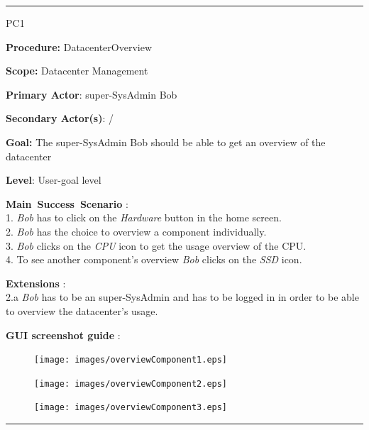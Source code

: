 \hrule
\vspace{0.5cm}
\begin{lyxlist}{PC1}
\small{
\item [\textbf{Procedure:}] DatacenterOverview
\item [\textbf{Scope:}] Datacenter Management
\item [\textbf{Primary Actor}:] super-SysAdmin Bob
\item [\textbf{Secondary Actor(s)}:] /
\item [\textbf{Goal:}] The super-SysAdmin Bob should be able to get an overview
of the datacenter
\item [\textbf{Level}:] User-goal level
\item [\textbf{Main~Success~Scenario}]:\\
1. \emph{Bob} has to click on the \emph{Hardware} button in the home screen.\\
2. \emph{Bob} has the choice to overview a component individually.\\
3. \emph{Bob} clicks on the \emph{CPU} icon to get the usage overview of the
CPU.\\
4. To see another component's overview \emph{Bob} clicks on the \emph{SSD}
icon.\\


\item [\textbf{Extensions}]:\\
2.a \emph{Bob} has to be an super-SysAdmin and has to be logged in in order to
be able to overview the datacenter's usage.\\

\item [\textbf{GUI screenshot guide}]:\\
}


\begin{figure}[H]
\centering
\texttt{[image: images/overviewComponent1.eps]}
\caption{\label{overflow}}
\end{figure}


\begin{figure}[H]
\centering
\texttt{[image: images/overviewComponent2.eps]}
\caption{\label{overflow}}
\end{figure}


\begin{figure}[H]
\centering
\texttt{[image: images/overviewComponent3.eps]}
\caption{\label{overflow}}
\end{figure}

\end{lyxlist}
\hrule
\vspace{0.5cm}


